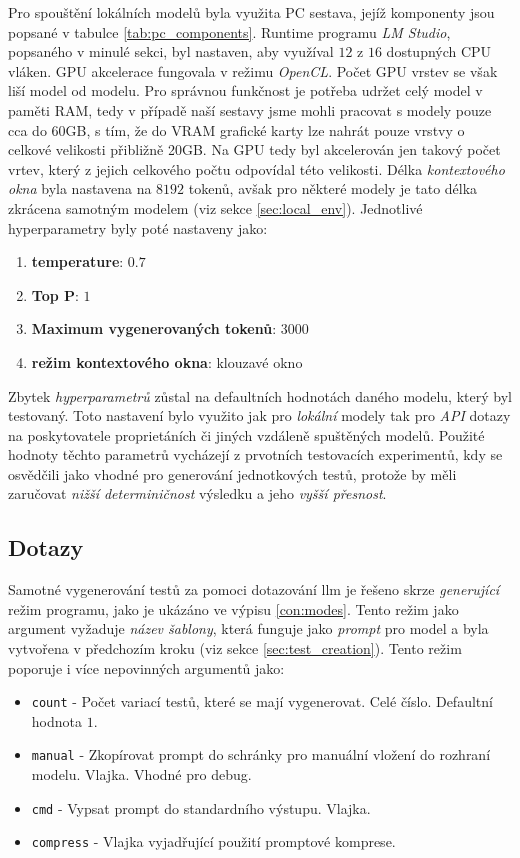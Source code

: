 \documentclass[czech, ma, kiv, he, iso690alph, pdf, viewonly]{fasthesis}
\begin{document}
            Pro spouštění lokálních modelů byla využita PC sestava, jejíž komponenty jsou popsané v tabulce \ref{tab:pc_components}. Runtime programu \textit{LM Studio}, popsaného v minulé sekci, byl nastaven, aby využíval \(12\) z \(16\) dostupných CPU vláken. GPU akcelerace fungovala v režimu \textit{OpenCL}. Počet GPU vrstev se však liší model od modelu. Pro správnou funkčnost je potřeba udržet celý model v paměti RAM, tedy v případě naší sestavy jsme mohli pracovat s modely pouze cca do 60GB, s tím, že do VRAM grafické karty lze nahrát pouze vrstvy o celkové velikosti přibližně 20GB. Na GPU tedy byl akcelerován jen takový počet vrtev, který z jejich celkového počtu odpovídal této velikosti. Délka \textit{kontextového okna} byla nastavena na \(8 192\) \gls{token}ů, avšak pro některé modely je tato délka zkrácena samotným modelem (viz sekce \ref{sec:local_env}). Jednotlivé hyperparametry byly poté nastaveny jako:
            \begin{enumerate}
                \item \textbf{\gls{temperature}}: \(0.7\)
                \item \textbf{Top P}: \(1\)
                \item \textbf{Maximum vygenerovaných tokenů}: \(3000\)
                \item \textbf{režim kontextového okna}: klouzavé okno
            \end{enumerate}
            Zbytek \emph{hyperparametrů} zůstal na defaultních hodnotách daného modelu, který byl testovaný. Toto nastavení bylo využito jak pro \textit{lokální} modely tak pro \textit{API} dotazy na poskytovatele proprietáních či jiných vzdáleně spuštěných modelů. Použité hodnoty těchto parametrů vycházejí z prvotních testovacích experimentů, kdy se osvědčili jako vhodné pro generování jednotkových testů, protože by měli zaručovat \textit{nižší determiničnost} výsledku a jeho \textit{vyšší přesnost}.

        \subsection{Dotazy} \label{sec:llm_requests}
        Samotné vygenerování testů za pomoci dotazování \Gls{llm} je řešeno skrze \textit{generující} režim programu, jako je ukázáno ve výpisu \ref{con:modes}. Tento režim jako argument vyžaduje \textit{název šablony}, která funguje jako \textit{prompt} pro model a byla vytvořena v předchozím kroku (viz sekce \ref{sec:test_creation}). Tento režim poporuje i více nepovinných argumentů jako:
        \begin{itemize}
            \item \verb|count| - Počet variací testů, které se mají vygenerovat. Celé číslo. Defaultní hodnota \(1\).
            \item \verb|manual| - Zkopírovat prompt do schránky pro manuální vložení do rozhraní modelu. Vlajka. Vhodné pro debug.
            \item \verb|cmd| - Vypsat prompt do standardního výstupu. Vlajka.
            \item \verb|compress| - Vlajka vyjadřující použití promptové komprese.
        \end{itemize}
\end{document}
